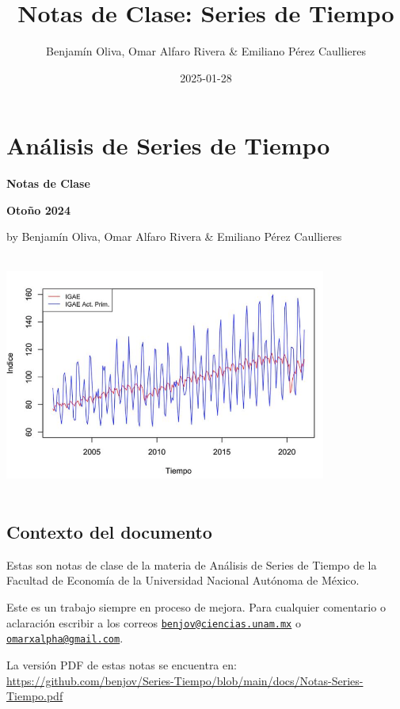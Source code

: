 \documentclass[
]{book}
\title{Notas de Clase: Series de Tiempo}
\author{Benjamín Oliva, Omar Alfaro Rivera \& Emiliano Pérez Caullieres}
\date{2025-01-28}
\begin{document}
\maketitle

{
\setcounter{tocdepth}{1}
\tableofcontents
}
\hypertarget{anuxe1lisis-de-series-de-tiempo}{%
\chapter*{Análisis de Series de Tiempo}\label{anuxe1lisis-de-series-de-tiempo}}

\textbf{Notas de Clase}

\textbf{Otoño 2024}

by Benjamín Oliva, Omar Alfaro Rivera \& Emiliano Pérez Caullieres

\includegraphics[width=4.16667in,height=3.125in]{Portada.png}

\hypertarget{contexto-del-documento}{%
\section*{Contexto del documento}\label{contexto-del-documento}}

Estas son notas de clase de la materia de Análisis de Series de Tiempo de la Facultad de Economía de la Universidad Nacional Autónoma de México.

Este es un trabajo siempre en proceso de mejora. Para cualquier comentario o aclaración escribir a los correos \href{mailto:benjov@ciencias.unam.mx}{\nolinkurl{benjov@ciencias.unam.mx}} o \href{mailto:omarxalpha@gmail.com}{\nolinkurl{omarxalpha@gmail.com}}.

La versión PDF de estas notas se encuentra en: \url{https://github.com/benjov/Series-Tiempo/blob/main/docs/Notas-Series-Tiempo.pdf}
\end{document}
